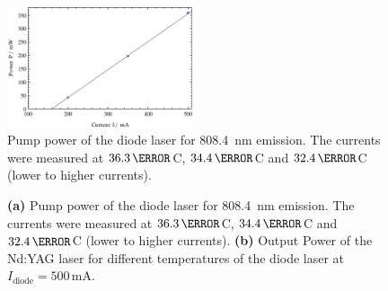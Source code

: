 \documentclass[a4paper]{scrartcl}
\numberwithin{equation}{section}
\numberwithin{figure}{section}
\numberwithin{table}{section}
\begin{document}
\begin{figure}
\centering
\includegraphics[width=0.485\textwidth]{img/PvsI808.pdf}
\caption{ \small  Pump power of the diode laser for \SI{808.4}{nm} emission. The currents were measured at $36.3\,\degree$C, $34.4\,\degree$C and $32.4\,\degree$C (lower to higher currents). }
\label{fig:cal}
\end{figure}

\begin{figure}
\centering
{}
\hfill
{}
\caption{\small \textbf{(a)} Pump power of the diode laser for \SI{808.4}{nm} emission. The currents were measured at $36.3\,\degree$C, $34.4\,\degree$C and $32.4\,\degree$C (lower to higher currents). \textbf{(b)} Output Power of the Nd:YAG laser for different temperatures of the diode laser at $I_\text{diode}=500\,\text{mA}$.}
\label{fig:power}
\end{figure}
\end{document}
